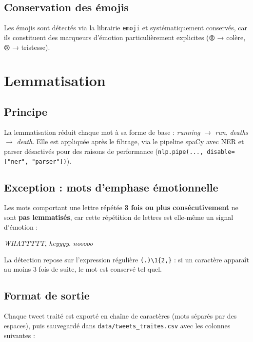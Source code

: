 \documentclass[12pt, a4paper]{article}
\begin{document}
\subsection{Conservation des émojis}

Les émojis sont détectés via la librairie \texttt{emoji} et systématiquement conservés,
car ils constituent des marqueurs d'émotion particulièrement explicites
(\texttt{😡} → colère, \texttt{😢} → tristesse).

\section{Lemmatisation}

\subsection{Principe}

La lemmatisation réduit chaque mot à sa forme de base :
\textit{running} $\rightarrow$ \textit{run}, \textit{deaths} $\rightarrow$ \textit{death}.
Elle est appliquée après le filtrage, via le pipeline spaCy avec NER et parser désactivés
pour des raisons de performance (\texttt{nlp.pipe(..., disable=["ner", "parser"])}).

\subsection{Exception : mots d'emphase émotionnelle}

Les mots comportant une lettre répétée \textbf{3 fois ou plus consécutivement} ne sont
\textbf{pas lemmatisés}, car cette répétition de lettres est elle-même un signal d'émotion :

\begin{center}
\textit{WHATTTTT}, \textit{heyyyy}, \textit{nooooo}
\end{center}

La détection repose sur l'expression régulière \texttt{(.)\textbackslash1\{2,\}} :
si un caractère apparaît au moins 3 fois de suite, le mot est conservé tel quel.

\subsection{Format de sortie}

Chaque tweet traité est exporté en chaîne de caractères (mots séparés par des espaces),
puis sauvegardé dans \texttt{data/tweets\_traites.csv} avec les colonnes suivantes :
\end{document}
